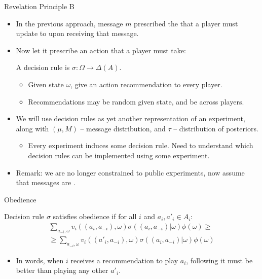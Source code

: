 \documentclass[english,10pt
,aspectratio=169
]{beamer}
\begin{document}
\begin{frame}{Revelation Principle B}
\begin{itemize}
	\item In the previous approach, message $m$ prescribed the  that a player must update to upon receiving that message.
	\item Now let it prescribe an \alert{action} that a player must take: 
	
	A \alert{decision rule} is $\sigma: \Omega \to \varDelta(A)$.
	\begin{itemize}
		\item Given state $\omega$, give an action recommendation to every player.
		\item Recommendations may be random given state, and be  across players.
	\end{itemize}
	\item We will use decision rules as yet another representation of an experiment, along with $(\mu,M)$ -- message distribution, and $\tau$ -- distribution of posteriors.
	\begin{itemize}
		\item Every experiment induces some decision rule. Need to understand which decision rules can be implemented using some experiment.
	\end{itemize}
	\item Remark: we are no longer constrained to public experiments, now assume that messages are .
\end{itemize}
\end{frame}


\begin{frame}{Obedience}
\begin{definition}
	Decision rule $\sigma$ satisfies \alert{obedience} if for all $i$ and $a_i,a'_i \in A_i$:
	\begin{align*}
		\sum_{a_{-i},\omega} v_i ((a_i,a_{-i}), \omega) \sigma ((a_i,a_{-i}) | \omega) \phi(\omega) \geq
		\\
		\geq \sum_{a_{-i},\omega} v_i ((a'_i,a_{-i}), \omega) \sigma ((a_i,a_{-i}) | \omega) \phi(\omega) 
	\end{align*} 
\end{definition}
\begin{itemize}
	\item In words, when $i$ receives a recommendation to play $a_i$, following it must be better than playing any other $a'_i$.
\end{itemize}
\end{frame}
\end{document}
